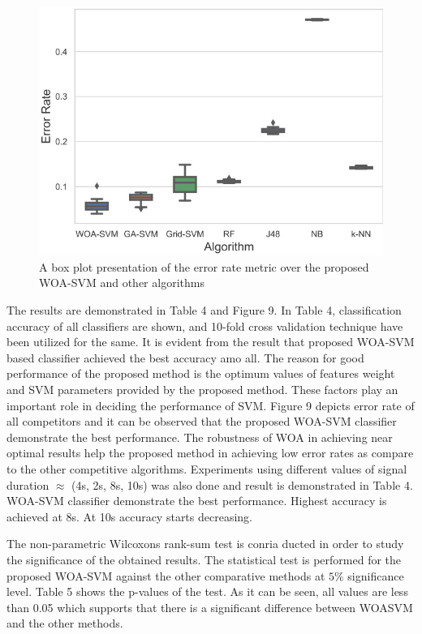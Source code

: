 \begin{figure}[htbp]
\centering
\includegraphics[width=0.8\linewidth]{images/691e3e4fd28e868d09ef54655323bc7e12274adaf194f1246ad306f060ab0f92.jpg}
\caption{A box plot presentation of the error rate metric over the proposed WOA-SVM and other algorithms}
\label{fig:9}
\end{figure}


The results are demonstrated in Table 4 and Figure 9. In Table 4, classification accuracy of all classifiers are shown, and 10-fold cross validation technique have been utilized for the same. It is evident from the result that proposed WOA-SVM based classifier achieved the best accuracy amo all. The reason for good performance of the proposed method is the optimum values of features weight and SVM parameters provided by the proposed method. These factors play an important role in deciding the performance of SVM. Figure 9 depicts error rate of all competitors and it can be observed that the proposed WOA-SVM classifier demonstrate the best performance. The robustness of WOA in achieving near optimal results help the proposed method in achieving low error rates as compare to the other competitive algorithms. Experiments using different values of signal duration $\approx$ (4s, 2s, 8s, 10s) was also done and result is demonstrated in Table 4. WOA-SVM classifier demonstrate the best performance. Highest accuracy is achieved at 8s. At 10s accuracy starts decreasing.

The non-parametric Wilcoxons rank-sum test is conria ducted in order to study the significance of the obtained results. The statistical test is performed for the proposed WOA-SVM against the other comparative methods at $5\%$ significance level. Table 5 shows the p-values of the test. As it can be seen, all values are less than 0.05 which supports that there is a significant difference between WOASVM and the other methods.

